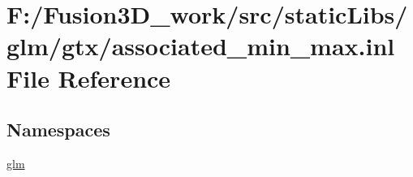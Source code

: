 \hypertarget{associated__min__max_8inl}{}\section{F\+:/\+Fusion3\+D\+\_\+work/src/static\+Libs/glm/gtx/associated\+\_\+min\+\_\+max.inl File Reference}
\label{associated__min__max_8inl}
\subsection*{Namespaces}
\begin{DoxyCompactItemize}
\item 
 \hyperlink{namespaceglm}{glm}
\end{DoxyCompactItemize}
